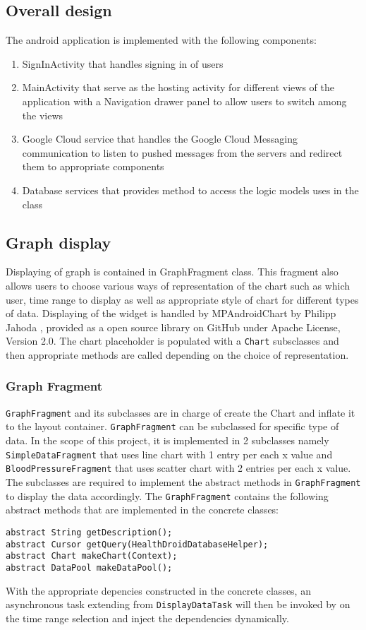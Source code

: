 \subsection{Overall design}
The android application is implemented with the following components:
\begin{enumerate}
    \item SignInActivity that handles signing in of users
    \item MainActivity that serve as the hosting activity for different views of the application with a Navigation
        drawer panel to allow users to switch among the views
    \item Google Cloud service that handles the Google Cloud Messaging communication to listen to pushed messages from
        the servers and redirect them to appropriate components
    \item Database services that provides method to access the logic models uses in the class
\end{enumerate}

\subsection{Graph display}
Displaying of graph is contained in GraphFragment class. This fragment also allows users to choose various ways of
representation of the chart such as which user, time range to display as well as appropriate style of chart for
different types of data. Displaying of the widget is handled by MPAndroidChart by Philipp Jahoda \cite{MPAndroidChart},
provided as a open source library on GitHub under Apache License, Version 2.0. The chart placeholder is populated with a
\texttt{Chart} subsclasses and then appropriate methods are called depending on the choice of representation.

\subsubsection{Graph Fragment}
\texttt{GraphFragment} and its subclasses are in charge of create the Chart and inflate it to the layout container.
\texttt{GraphFragment} can be subclassed for specific type of data. In the scope of this project, it is implemented in 2
subclasses namely \texttt{SimpleDataFragment} that uses line chart with 1 entry per each x value and
\texttt{BloodPressureFragment} that uses scatter chart with 2 entries per each x value. The subclasses are required to
implement the abstract methods in \texttt{GraphFragment} to display the data accordingly.
The \texttt{GraphFragment} contains the following abstract methods that are implemented in the concrete classes:
\begin{lstlisting}
abstract String getDescription();
abstract Cursor getQuery(HealthDroidDatabaseHelper);
abstract Chart makeChart(Context);
abstract DataPool makeDataPool();
\end{lstlisting}
With the appropriate depencies constructed in the concrete classes, an asynchronous task extending from
\texttt{DisplayDataTask} will then be invoked by on the time range selection and inject the dependencies dynamically.


